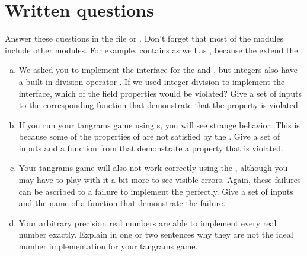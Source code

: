 \documentclass{pset}
\begin{document}
\part{Written questions}

Answer these questions in the file  or
.  Don't forget that most of the 
modules include other  modules.  For example,
 contains  as well as
, because the  extend the
.


\begin{enumerate}[(a)]
\item We asked you to implement the  interface for the 
      and , but integers also have a built-in division operator
      \code{(/)}.  If we used integer division to implement the 
      interface, which of the field properties would be violated?  Give a set of
      inputs to the corresponding  function that
      demonstrate that the property is violated.

\item If you run your tangrams game using s,
      you will see strange behavior.  This is because some of the properties of
       are not satisfied by the .  Give a set of
      inputs and a function from  that demonstrate
      a property that is violated.

\item Your tangrams game will also not work correctly using the ,
      although you may have to play with it a bit more to see visible errors.
      Again, these failures can be ascribed to a failure to implement the
       perfectly.  Give a set of inputs and the
      name of a  function that demonstrate the
      failure.

\item Your arbitrary precision real numbers are able to implement every real
      number exactly.  Explain in one or two sentences why they are not the
      ideal number implementation for your tangrams game.
\end{enumerate}
\end{document}
